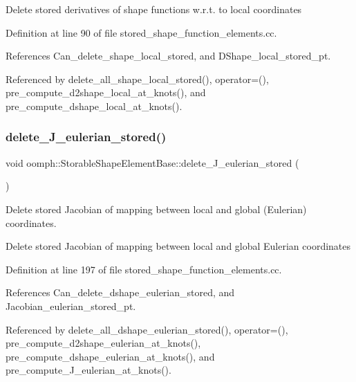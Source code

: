 Delete stored derivatives of shape functions w.\+r.\+t. to local coordinates 

Definition at line 90 of file stored\+\_\+shape\+\_\+function\+\_\+elements.\+cc.



References Can\+\_\+delete\+\_\+shape\+\_\+local\+\_\+stored, and D\+Shape\+\_\+local\+\_\+stored\+\_\+pt.



Referenced by delete\+\_\+all\+\_\+shape\+\_\+local\+\_\+stored(), operator=(), pre\+\_\+compute\+\_\+d2shape\+\_\+local\+\_\+at\+\_\+knots(), and pre\+\_\+compute\+\_\+dshape\+\_\+local\+\_\+at\+\_\+knots().

\mbox{\label{classoomph_1_1StorableShapeElementBase_ab9e219f5624ced52f74ca4fefc2f711b}} 
\subsubsection{\texorpdfstring{delete\+\_\+\+J\+\_\+eulerian\+\_\+stored()}{delete\_J\_eulerian\_stored()}}
{\footnotesize\ttfamily void oomph\+::\+Storable\+Shape\+Element\+Base\+::delete\+\_\+\+J\+\_\+eulerian\+\_\+stored (\begin{DoxyParamCaption}{ }\end{DoxyParamCaption})}



Delete stored Jacobian of mapping between local and global (Eulerian) coordinates. 

Delete stored Jacobian of mapping between local and global Eulerian coordinates 

Definition at line 197 of file stored\+\_\+shape\+\_\+function\+\_\+elements.\+cc.



References Can\+\_\+delete\+\_\+dshape\+\_\+eulerian\+\_\+stored, and Jacobian\+\_\+eulerian\+\_\+stored\+\_\+pt.



Referenced by delete\+\_\+all\+\_\+dshape\+\_\+eulerian\+\_\+stored(), operator=(), pre\+\_\+compute\+\_\+d2shape\+\_\+eulerian\+\_\+at\+\_\+knots(), pre\+\_\+compute\+\_\+dshape\+\_\+eulerian\+\_\+at\+\_\+knots(), and pre\+\_\+compute\+\_\+\+J\+\_\+eulerian\+\_\+at\+\_\+knots().

